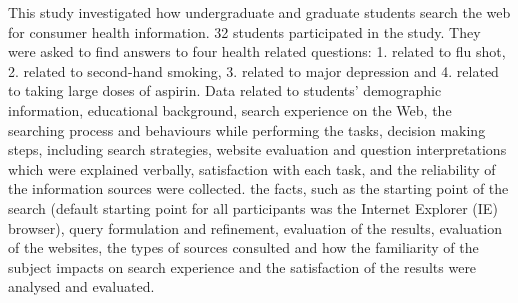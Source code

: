\documentclass[]{article}
\begin{document}
This study investigated how undergraduate and graduate students search the web for consumer health information. 32 students participated in the study. They were asked to find answers to four health related questions: 1. related to flu shot, 2. related to second-hand smoking, 3. related to major depression and 4. related to taking large doses of aspirin. Data related to students' demographic information, educational background, search experience on the Web, the searching process and behaviours while performing the tasks, decision making steps, including search strategies, website evaluation and question interpretations which were explained verbally, satisfaction with each task, and the reliability of the information sources were collected. the facts, such as the starting point of the search (default starting point for all participants was the Internet Explorer (IE) browser), query formulation and refinement, evaluation of the results, evaluation of the websites, the types of sources consulted and how the familiarity of the subject impacts on search experience and the satisfaction of the results were analysed and evaluated.
\end{document}
